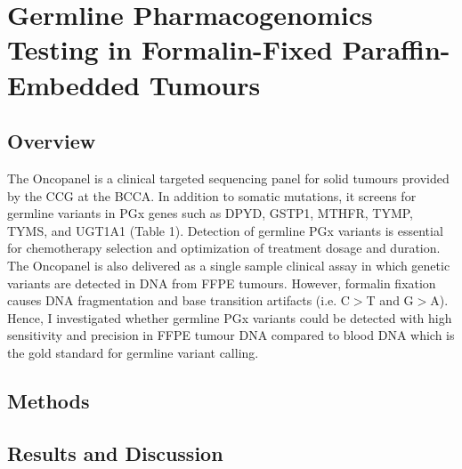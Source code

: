 
\chapter{Germline Pharmacogenomics Testing in Formalin-Fixed Paraffin-Embedded Tumours}
\label{ch:GermlinePharmacogenomicsTestinginFormalin-FixedParaffin-EmbeddedTumours}

\section{Overview}
\label{sec:Overview}


The Oncopanel is a clinical targeted sequencing panel for solid tumours provided by the CCG at the BCCA. In addition to somatic mutations, it screens for germline variants in PGx genes such as DPYD, GSTP1, MTHFR, TYMP, TYMS, and UGT1A1 (Table 1). Detection of germline PGx variants is essential for chemotherapy selection and optimization of treatment dosage and duration. The Oncopanel is also delivered as a single sample clinical assay in which genetic variants are detected in DNA from FFPE tumours. However, formalin fixation causes DNA fragmentation and base transition artifacts (i.e. C$>$T and G$>$A). Hence, I investigated whether germline PGx variants could be detected with high sensitivity and precision in FFPE tumour DNA compared to blood DNA which is the gold standard for germline variant calling.

\section{Methods}
\label{sec:Methods}

\section{Results and Discussion}
\label{sec:Results and Discussion}
